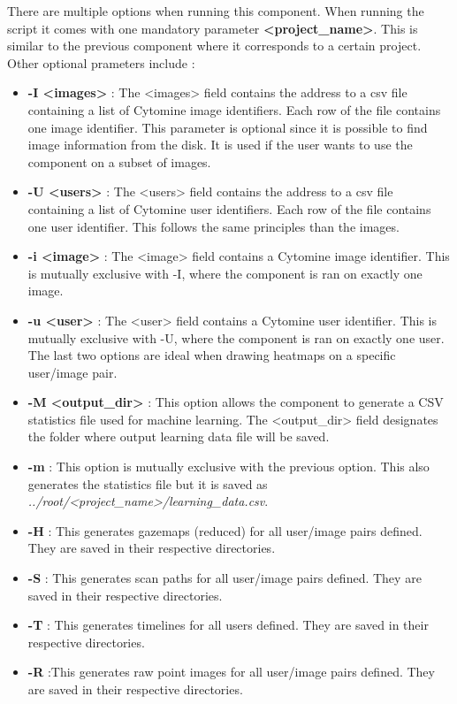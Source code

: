 \documentclass[a4paper,11pt]{report}
\numberwithin{figure}{section} %
\begin{document}
    There are multiple options when running this component.
    When running the script it comes with one mandatory parameter \textbf{<project\_name>}.
    This is similar to the previous component where it corresponds to a certain project.
    Other optional prameters include :
    \begin{itemize}
        \item[\textbullet] \textbf{-I <images>} : The <images> field contains the address to a csv file containing a list of Cytomine image identifiers.
        Each row of the file contains one image identifier.
        This parameter is optional since it is possible to find image information from the disk.
        It is used if the user wants to use the component on a subset of images.
        \item[\textbullet] \textbf{-U <users>} : The <users> field contains the address to a csv file containing a list of Cytomine user identifiers.
        Each row of the file contains one user identifier.
        This follows the same principles than the images.
        \item[\textbullet] \textbf{-i <image>} : The <image> field contains a Cytomine image identifier.
        This is mutually exclusive with -I, where the component is ran on exactly one image.
        \item[\textbullet] \textbf{-u <user>} : The <user> field contains a Cytomine user identifier.
        This is mutually exclusive with -U, where the component is ran on exactly one user.
        The last two options are ideal when drawing heatmaps on a specific user/image pair.
        \item[\textbullet] \textbf{-M <output\_dir>} : This option allows the component to generate a CSV statistics file used for machine learning.
        The <output\_dir> field designates the folder where output learning data file will be saved.
        \item[\textbullet] \textbf{-m} : This option is mutually exclusive with the previous option.
        This also generates the statistics file but it is saved as \textit{../root/<project\_name>/learning\_data.csv}.
        \item[\textbullet] \textbf{-H} : This generates gazemaps (reduced) for all user/image pairs defined.
        They are saved in their respective directories.
        \item[\textbullet] \textbf{-S} : This generates scan paths for all user/image pairs defined.
        They are saved in their respective directories.
        \item[\textbullet] \textbf{-T} : This generates timelines for all users defined.
        They are saved in their respective directories.
        \item[\textbullet] \textbf{-R} :This generates raw point images for all user/image pairs defined.
        They are saved in their respective directories.
    \end{itemize}
\end{document}
